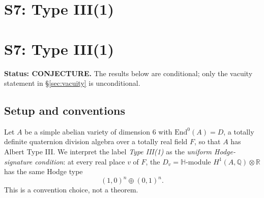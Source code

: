 \documentclass{article}
\begin{document}
\section{S7: Type III(1)}
\section*{S7: Type III(1)}

\noindent\textbf{Status: CONJECTURE.} The results below are conditional; only the vacuity statement in \S\ref{sec:vacuity} is unconditional.

\subsection*{Setup and conventions}

Let $A$ be a simple abelian variety of dimension $6$ with $\mathrm{End}^0(A) = D$, a totally definite quaternion division algebra over a totally real field $F$, so that $A$ has Albert Type III. We interpret the label \emph{Type III(1)} as the \emph{uniform Hodge-signature condition}: at every real place $v$ of $F$, the $D_v = \mathbb{H}$-module $H^1(A,\mathbb{Q}) \otimes \mathbb{R}$ has the same Hodge type
\[
(1,0)^n \oplus (0,1)^n .
\]
This is a convention choice, not a theorem.
\end{document}
